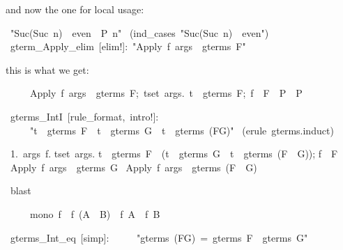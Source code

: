 \begin{isabelle}
\begin{isamarkuptext}
and now the one for local usage:%
\end{isamarkuptext}
\ "Suc(Suc\ n)\ \isasymin \ even\ \isasymLongrightarrow \ P\ n"\isanewline
{}\ (ind_cases\ "Suc(Suc\ n)\ \isasymin \ even")\isanewline
{}\isanewline
\isanewline
{}\ gterm_Apply_elim\ [elim!]:\ "Apply\ f\ args\ \isasymin \ gterms\ F"
\begin{isamarkuptext}
this is what we get:

\begin{isabelle}
\ \ \ \ \ \isasymlbrakk Apply\ f\ args\ \isasymin \ gterms\ F;\ \isasymlbrakk \isasymforall t\isasymin set\ args.\ t\ \isasymin \ gterms\ F;\ f\ \isasymin \ F\isasymrbrakk \ \isasymLongrightarrow \ P\isasymrbrakk \ \isasymLongrightarrow \ P%
\end{isabelle}
\end{isamarkuptext}
\ gterms_IntI\ [rule_format,\ intro!]:\isanewline
\ \ \ \ \ "t\ \isasymin \ gterms\ F\ \isasymLongrightarrow \ t\ \isasymin \ gterms\ G\ \isasymlongrightarrow \ t\ \isasymin \ gterms\ (F\isasyminter G)"\isanewline
{}\ (erule\ gterms.induct)
\begin{isamarkuptxt}
\begin{isabelle}
\ 1.\ \isasymAnd args\ f.\isanewline
{}\isasymlbrakk \isasymforall t\isasymin set\ args.\isanewline
{}t\ \isasymin \ gterms\ F\ \isasymand \ (t\ \isasymin \ gterms\ G\ \isasymlongrightarrow \ t\ \isasymin \ gterms\ (F\ \isasyminter \ G));\isanewline
{}f\ \isasymin \ F\isasymrbrakk \isanewline
{}\isasymLongrightarrow \ Apply\ f\ args\ \isasymin \ gterms\ G\ \isasymlongrightarrow \isanewline
{}Apply\ f\ args\ \isasymin \ gterms\ (F\ \isasyminter \ G)
\end{isabelle}
\end{isamarkuptxt}
\ blast\isanewline
{}
\begin{isamarkuptext}
\begin{isabelle}
\ \ \ \ \ mono\ f\ \isasymLongrightarrow \ f\ (A\ \isasyminter \ B)\ \isasymsubseteq \ f\ A\ \isasyminter \ f\ B%
\end{isabelle}
\end{isamarkuptext}
\ gterms_Int_eq\ [simp]:\isanewline
\ \ \ \ \ "gterms\ (F\isasyminter G)\ =\ gterms\ F\ \isasyminter \ gterms\ G"\isanewline

\end{isabelle}
